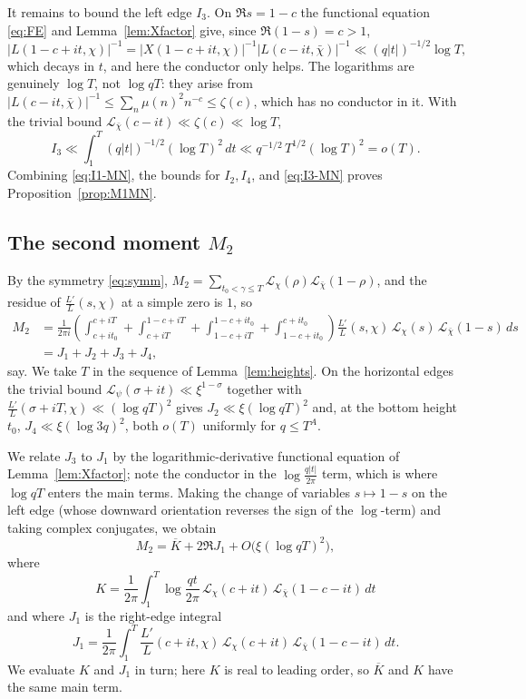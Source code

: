 \documentclass[12pt,a4paper,reqno]{amsart}
\theoremstyle{remark}
\numberwithin{equation}{section}
\begin{document}
It remains to bound the left edge $I_3$. On $\Re s=1-c$ the functional equation \eqref{eq:FE} and Lemma~\ref{lem:Xfactor} give, since $\Re(1-s)=c>1$,
\[
\bigl|L(1-c+it,\chi)\bigr|^{-1}=\bigl|X(1-c+it,\chi)\bigr|^{-1}\bigl|L(c-it,\bar\chi)\bigr|^{-1}\ll(q|t|)^{-1/2}\log T,
\]
which decays in $t$, and here the conductor only helps. The logarithms are genuinely $\log T$, not $\log qT$: they arise from $|L(c-it,\bar\chi)|^{-1}\le\sum_n\mu(n)^2n^{-c}\le\zeta(c)$, which has no conductor in it. With the trivial bound $\mathcal{L}_{\bar\chi}(c-it)\ll\zeta(c)\ll\log T$,
\begin{equation}\label{eq:I3-MN}
I_3\ll\int_1^T(q|t|)^{-1/2}(\log T)^2\,dt\ll q^{-1/2}\,T^{1/2}(\log T)^2=o(T).
\end{equation}
Combining \eqref{eq:I1-MN}, the bounds for $I_2,I_4$, and \eqref{eq:I3-MN} proves Proposition~\ref{prop:M1MN}.

\subsection{The second moment $M_2$}
By the symmetry \eqref{eq:symm}, $M_2=\sum_{t_0<\gamma\le T}\mathcal{L}_\chi(\rho)\mathcal{L}_{\bar\chi}(1-\rho)$, and the residue of $\frac{L'}{L}(s,\chi)$ at a simple zero is $1$, so
\[
\begin{aligned}
M_2&=\frac{1}{2\pi i}\left(\int_{c+it_0}^{c+iT}+\int_{c+iT}^{1-c+iT}+\int_{1-c+iT}^{1-c+it_0}+\int_{1-c+it_0}^{c+it_0}\right)\frac{L'}{L}(s,\chi)\,\mathcal{L}_\chi(s)\,\mathcal{L}_{\bar\chi}(1-s)\,ds\\
&=J_1+J_2+J_3+J_4,
\end{aligned}
\]
say. We take $T$ in the sequence of Lemma~\ref{lem:heights}. On the horizontal edges the trivial bound $\mathcal{L}_\psi(\sigma+it)\ll\xi^{1-\sigma}$ together with $\frac{L'}{L}(\sigma+iT,\chi)\ll(\log qT)^2$ gives $J_2\ll\xi(\log qT)^2$ and, at the bottom height $t_0$, $J_4\ll\xi(\log 3q)^2$, both $o(T)$ uniformly for $q\le T^{A}$.

We relate $J_3$ to $J_1$ by the logarithmic-derivative functional equation of Lemma~\ref{lem:Xfactor}; note the conductor in the $\log\frac{q|t|}{2\pi}$ term, which is where $\log qT$ enters the main terms. Making the change of variables $s\mapsto1-s$ on the left edge (whose downward orientation reverses the sign of the $\log$-term) and taking complex conjugates, we obtain
\[
M_2=\overline{K}+2\Re J_1+O\bigl(\xi(\log qT)^2\bigr),
\]
where
\[
K=\frac{1}{2\pi}\int_1^T\log\frac{qt}{2\pi}\,\mathcal{L}_\chi(c+it)\,\mathcal{L}_{\bar\chi}(1-c-it)\,dt
\]
and where $J_1$ is the right-edge integral
\[
J_1=\frac{1}{2\pi}\int_1^T\frac{L'}{L}(c+it,\chi)\,\mathcal{L}_\chi(c+it)\,\mathcal{L}_{\bar\chi}(1-c-it)\,dt .
\]
We evaluate $K$ and $J_1$ in turn; here $K$ is real to leading order, so $\overline K$ and $K$ have the same main term.
\end{document}
